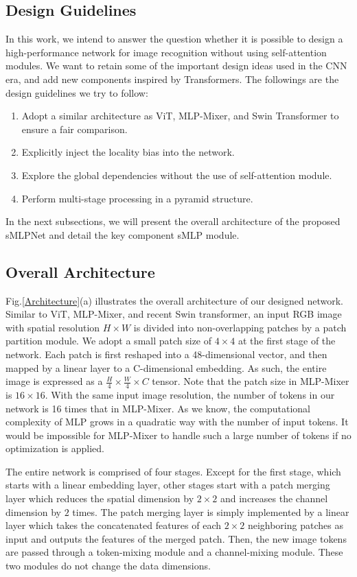 \documentclass[letterpaper]{article} \usepackage{aaai22}  \usepackage{times}  \usepackage{helvet}  \usepackage{courier}  \usepackage[hyphens]{url}  \usepackage{graphicx} \usepackage{color}
\begin{document}
\subsection{Design Guidelines}
In this work, we intend to answer the question whether it is possible to design a high-performance network for image recognition without using self-attention modules. We want to retain some of the important design ideas used in the CNN era, and add new components inspired by Transformers. The followings are the design guidelines we try to follow:
\begin{enumerate}
    \item Adopt a similar architecture as ViT, MLP-Mixer, and Swin Transformer to ensure a fair comparison.
    \item Explicitly inject the locality bias into the network.
    \item Explore the global dependencies without the use of self-attention module.
    \item Perform multi-stage processing in a pyramid structure.
\end{enumerate}
In the next subsections, we will present the overall architecture of the proposed sMLPNet and detail the key component sMLP module. 

\subsection{Overall Architecture}

Fig.\ref{Architecture}(a) illustrates the overall architecture of our designed network. Similar to ViT, MLP-Mixer, and recent Swin transformer, an input RGB image with spatial resolution $H \times W$ is divided into non-overlapping patches by a patch partition module. We adopt a small patch size of $4 \times 4$ at the first stage of the network. Each patch is first reshaped into a 48-dimensional vector, and then mapped by a linear layer to a C-dimensional embedding. As such, the entire image is expressed as a $\frac{H}{4} \times \frac{W}{4} \times C$ tensor. Note that the patch size in MLP-Mixer is $16 \times 16$. With the same input image resolution, the number of tokens in our network is 16 times that in MLP-Mixer. As we know, the computational complexity of MLP grows in a quadratic way with the number of input tokens. It would be impossible for MLP-Mixer to handle such a large number of tokens if no optimization is applied. 

The entire network is comprised of four stages. Except for the first stage, which starts with a linear embedding layer, other stages start with a patch merging layer which reduces the spatial dimension by $2 \times 2$ and increases the channel dimension by $2$ times. The patch merging layer is simply implemented by a linear layer which takes the concatenated features of each $2 \times 2$ neighboring patches as input and outputs the features of the merged patch. Then, the new image tokens are passed through a token-mixing module and a channel-mixing module. These two modules do not change the data dimensions.
\end{document}

